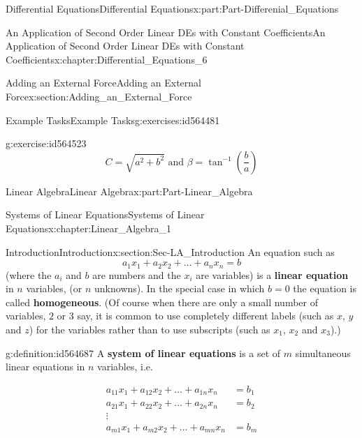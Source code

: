 \documentclass[oneside,10pt,]{book}
\newcommand{\terminology}[1]{\textbf{#1}}
\numberwithin{equation}{section}
\newcommand{\amp}{&}
\begin{document}
\begin{partptx}{Differential Equations}{}{Differential Equations}{}{}{x:part:Part-Differenial_Equations}
\begin{chapterptx}{An Application of Second Order Linear DEs with Constant Coefficients}{}{An Application of Second Order Linear DEs with Constant Coefficients}{}{}{x:chapter:Differential_Equations_6}
\begin{sectionptx}{Adding an External Force}{}{Adding an External Force}{}{}{x:section:Adding_an_External_Force}
\begin{exercises-subsection-numberless}{Example Tasks}{}{Example Tasks}{}{}{g:exercises:id564481}
\begin{divisionexercise}{3}{}{}{g:exercise:id564523}
\begin{equation*}
C=\sqrt{a^2+b^2} \textrm{ and } \beta=\tan^{-1}\left(\frac{b}{a}\right)
\end{equation*}
%
\end{divisionexercise}%
\end{exercises-subsection-numberless}
\end{sectionptx}
\end{chapterptx}
\end{partptx}
%
%
\typeout{************************************************}
\typeout{************************************************}
%
\begin{partptx}{Linear Algebra}{}{Linear Algebra}{}{}{x:part:Part-Linear_Algebra}
%
\typeout{************************************************}
\typeout{************************************************}
%
\begin{chapterptx}{Systems of Linear Equations}{}{Systems of Linear Equations}{}{}{x:chapter:Linear_Algebra_1}
%
%
\typeout{************************************************}
\typeout{************************************************}
%
\begin{sectionptx}{Introduction}{}{Introduction}{}{}{x:section:Sec-LA_Introduction}
An equation such as%
\begin{equation*}
a_1x_1+a_2x_2+\dots+a_nx_n=b
\end{equation*}
(where the \(a_i\) and \(b\) are numbers and the \(x_i\) are variables) is a \terminology{linear equation} in \(n\) variables, (or \(n\) unknowns). In the special case in which \(b=0\) the equation is called \terminology{homogeneous}. (Of course when there are only a small number of variables, \(2\) or \(3\) say, it is common to use completely different labels (such as \(x\), \(y\) and \(z\)) for the variables rather than to use subscripts (such as \(x_1\), \(x_2\) and \(x_3\)).)%
\begin{definition}{}{g:definition:id564687}%
A \terminology{system of linear equations} is a set of \(m\) simultaneous linear equations in \(n\) variables, i.e.%
\par
%
\begin{align*}
a_{11}x_1+a_{12}x_2+\dots+a_{1n}x_n \amp =b_1\\
a_{21}x_1+a_{22}x_2+\dots+a_{2n}x_n \amp =b_2\\
\vdots\\
a_{m1}x_1+a_{m2}x_2+\dots+a_{mn}x_n \amp =b_m

\end{align*}
\end{definition}
\end{sectionptx}
\end{chapterptx}
\end{partptx}
\end{document}
